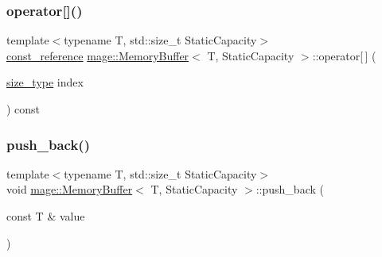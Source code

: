 \mbox{\label{classmage_1_1_memory_buffer_aabd7699f6861881f636a1083e1d161f8}} 
\subsubsection{\texorpdfstring{operator[]()}{operator[]()}\hspace{0.1cm}{\footnotesize\ttfamily [2/2]}}
{\footnotesize\ttfamily template$<$typename T, std\+::size\+\_\+t Static\+Capacity$>$ \\
\mbox{\hyperlink{classmage_1_1_memory_buffer_aa54883bc0cb483fef570663344f85bb7}{const\+\_\+reference}} \mbox{\hyperlink{classmage_1_1_memory_buffer}{mage\+::\+Memory\+Buffer}}$<$ T, Static\+Capacity $>$\+::operator\mbox{[}$\,$\mbox{]} (\begin{DoxyParamCaption}\item[{\mbox{\hyperlink{classmage_1_1_memory_buffer_a77b459da2e6f1c57c21467a6eff8e9f9}{size\+\_\+type}}}]{index }\end{DoxyParamCaption}) const\hspace{0.3cm}{\ttfamily [noexcept]}}

\mbox{\label{classmage_1_1_memory_buffer_a58fa7b8f32f83d85d84037acc41add92}} 
\subsubsection{\texorpdfstring{push\+\_\+back()}{push\_back()}\hspace{0.1cm}{\footnotesize\ttfamily [1/2]}}
{\footnotesize\ttfamily template$<$typename T, std\+::size\+\_\+t Static\+Capacity$>$ \\
void \mbox{\hyperlink{classmage_1_1_memory_buffer}{mage\+::\+Memory\+Buffer}}$<$ T, Static\+Capacity $>$\+::push\+\_\+back (\begin{DoxyParamCaption}\item[{const T \&}]{value }\end{DoxyParamCaption})}

\mbox{\label{classmage_1_1_memory_buffer_a5fe95cfae4c8d260f4a7af03b2999cf4}} 
